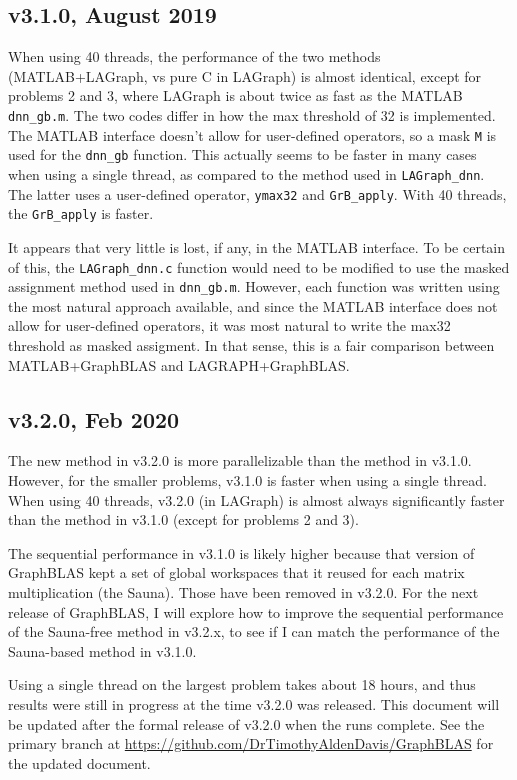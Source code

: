 \documentclass[12pt]{article}
\begin{document}
\subsection{v3.1.0, August 2019}

When using 40 threads, the performance of the two methods
(MATLAB+LAGraph, vs pure C in LAGraph) is
almost identical, except for problems 2 and 3, where LAGraph
is about twice as fast as the MATLAB \verb'dnn_gb.m'.
The two codes differ in how the max threshold of 32 is implemented.  The MATLAB
interface doesn't allow for user-defined operators, so a mask \verb'M' is used
for the \verb'dnn_gb' function.  This actually seems to be faster in many cases
when using a single thread, as compared to the method used in
\verb'LAGraph_dnn'.  The latter uses a user-defined operator, \verb'ymax32' and
\verb'GrB_apply'.  With 40 threads, the \verb'GrB_apply' is faster.

  It appears
that very little is lost, if any, in the MATLAB interface.  To be certain of
this, the \verb'LAGraph_dnn.c' function would need to be modified to use the
masked assignment method used in \verb'dnn_gb.m'.  However, each function was
written using the most natural approach available, and since the MATLAB
interface does not allow for user-defined operators, it was most natural to
write the max32 threshold as masked assigment.  In that sense, this is a
fair comparison between MATLAB+GraphBLAS and LAGRAPH+GraphBLAS.

\subsection{v3.2.0, Feb 2020}

The new method in v3.2.0 is more parallelizable than the method in v3.1.0.
However, for the smaller problems, v3.1.0 is faster when using a single thread.
When using 40 threads, v3.2.0 (in LAGraph) is almost always significantly
faster than the method in v3.1.0 (except for problems 2 and 3).

The sequential performance in v3.1.0 is likely higher because that version of
GraphBLAS kept a set of global workspaces that it reused for each matrix
multiplication (the Sauna).  Those have been removed in v3.2.0.  For the next
release of GraphBLAS, I will explore how to improve the sequential performance
of the Sauna-free method in v3.2.x, to see if I can match the performance of
the Sauna-based method in v3.1.0.

Using a single thread on the largest problem takes about 18 hours, and thus
results were still in progress at the time v3.2.0 was released.  This document
will be updated after the formal release of v3.2.0 when the runs complete.  See
the primary branch at \url{https://github.com/DrTimothyAldenDavis/GraphBLAS} for
the updated document.
\end{document}
